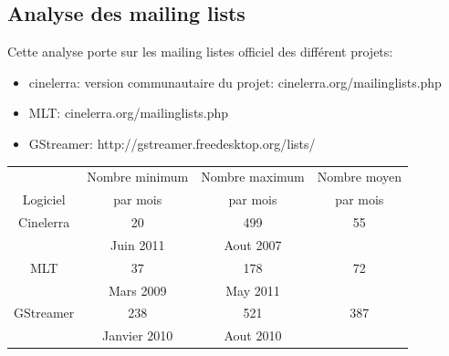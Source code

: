 \subsection {Analyse des mailing lists}

Cette analyse porte sur les mailing listes officiel des différent
projets:

\begin{itemize}

  \item {cinelerra: version communautaire du projet:
    cinelerra.org/mailinglists.php}

  \item {MLT: cinelerra.org/mailinglists.php}

  \item {GStreamer: http://gstreamer.freedesktop.org/lists/}

\end{itemize}


\begin{center}

  \begin{tabular}{ | c | c | c | c|}

    \hline

         & Nombre minimum & Nombre maximum & Nombre moyen \\

Logiciel & par mois       & par mois   & par mois \\

\hline \hline

Cinelerra & 20 & 499 & 55 \\

          &  Juin 2011 & Aout 2007 & \\

\hline

MLT\index{MLT} & 37 & 178 & 72 \\

     & Mars 2009 & May 2011 & \\

\hline

GStreamer & 238 & 521 &  387\\

          & Janvier 2010 & Aout 2010 & \\

\hline

  \end{tabular}

\end{center}

